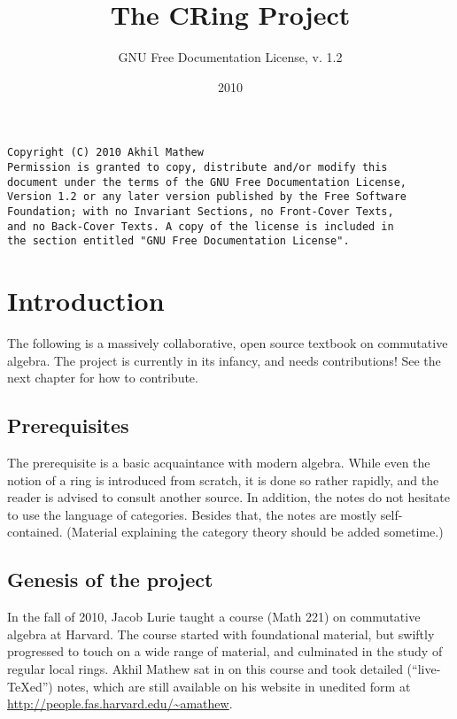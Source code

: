 
\title{The CRing Project}
\author{GNU Free Documentation License, v. 1.2}
\date{2010}

\maketitle
\begin{verbatim}
Copyright (C) 2010 Akhil Mathew 
Permission is granted to copy, distribute and/or modify this
document under the terms of the GNU Free Documentation License,
Version 1.2 or any later version published by the Free Software
Foundation; with no Invariant Sections, no Front-Cover Texts,
and no Back-Cover Texts. A copy of the license is included in
the section entitled "GNU Free Documentation License". \end{verbatim}


\fancyhead{}
\fancyfoot{}
\tableofcontents

\newpage 


\pagestyle{fancy}



\chapter*{Introduction}

The following is a massively collaborative, open source textbook on
commutative algebra. The project is currently in its infancy, and needs
contributions! See the next chapter for how to contribute.

\section*{Prerequisites}
The prerequisite  is a basic acquaintance with modern
algebra. While even the notion of a ring is introduced from scratch, it is
done so rather rapidly, and the reader is advised to consult another source.
In addition, the notes do not hesitate to use the language of categories.
Besides that, the notes are mostly self-contained. (Material explaining the
category theory should be added sometime.) 

\section*{Genesis of the project}
In the fall of 2010, Jacob Lurie taught a course (Math 221) on commutative
algebra at Harvard. 
The course started with foundational material, but swiftly progressed to touch on a wide range of
material, and culminated in the study of regular local rings. 
Akhil Mathew sat in on this course and took detailed
(``live-\TeX ed'') notes, which are still available on his website in unedited
form at 
\url{http://people.fas.harvard.edu/~amathew}. 

